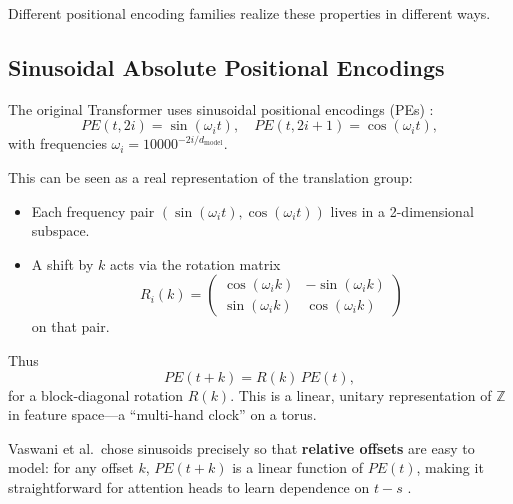\documentclass[11pt]{article}
\theoremstyle{definition}
\begin{document}
Different positional encoding families realize these properties in different ways.

\subsection{Sinusoidal Absolute Positional Encodings}

The original Transformer uses sinusoidal positional encodings (PEs) \cite{vaswani2017attention}:
\[
PE(t, 2i)   = \sin(\omega_i t),\quad
PE(t, 2i+1) = \cos(\omega_i t),
\]
with frequencies \(\omega_i = 10000^{-2i/d_{\text{model}}}\).

This can be seen as a real representation of the translation group:
\begin{itemize}
    \item Each frequency pair \((\sin(\omega_i t), \cos(\omega_i t))\) lives in a 2-dimensional subspace.
    \item A shift by \(k\) acts via the rotation matrix
    \[
    R_i(k) =
    \begin{pmatrix}
    \cos(\omega_i k) & -\sin(\omega_i k) \\
    \sin(\omega_i k) &  \cos(\omega_i k)
    \end{pmatrix}
    \]
    on that pair.
\end{itemize}

Thus
\[
PE(t + k) = R(k)\,PE(t),
\]
for a block-diagonal rotation \(R(k)\). This is a linear, unitary representation of \(\mathbb{Z}\) in feature space---a ``multi-hand clock'' on a torus.

Vaswani et al.\ chose sinusoids precisely so that \textbf{relative offsets} are easy to model: for any offset \(k\), \(PE(t+k)\) is a linear function of \(PE(t)\), making it straightforward for attention heads to learn dependence on \(t-s\) \cite{vaswani2017attention}.
\end{document}
